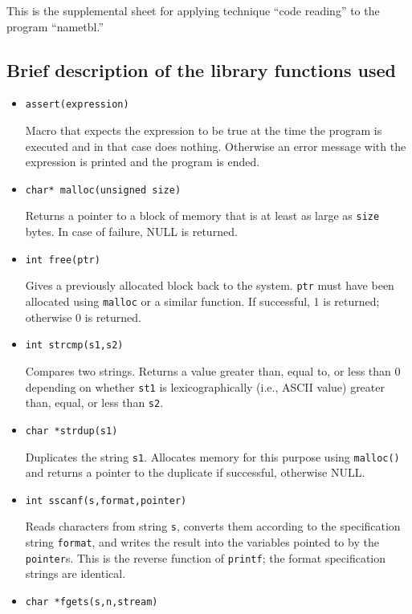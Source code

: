 
This is the supplemental sheet 
for applying technique ``code reading''
to the program ``nametbl.''

\subsection*{Brief description of the library functions used}

\begin{itemize}

\item {\tt assert(expression)}

Macro that expects the expression to be true at the time the
program is executed and in that case does nothing.  Otherwise an error
message with the expression is printed and the program is ended.

\item {\tt char* malloc(unsigned size)}

Returns a pointer to a block of memory that is at least as large as
{\tt size} bytes.  In case of failure, NULL is returned.

\item {\tt int free(ptr)}

Gives a previously allocated block back to the system.  
{\tt ptr} must have been  allocated using {\tt malloc} or a similar
function.  If successful, 1 is returned; otherwise 0 is returned.

\item {\tt int strcmp(s1,s2)}

Compares two strings.  Returns a value greater than, equal to, or less
than 0 depending on whether {\tt st1} is lexicographically (i.e.,
ASCII value) greater than, equal, or less than {\tt s2}.

\item {\tt char *strdup(s1)}

Duplicates the string {\tt s1}.  Allocates memory for this purpose
using {\tt malloc()} and returns a pointer to the duplicate if
successful, otherwise NULL.

\item {\tt int sscanf(s,format,pointer)}

Reads characters from string {\tt s}, converts them according to
the specification string {\tt format}, and writes the result into
the variables pointed to by the {\tt pointer}s.
This is the reverse function of {\tt printf}; the format specification
strings are identical.

\item {\tt char *fgets(s,n,stream)}


\end{itemize}
